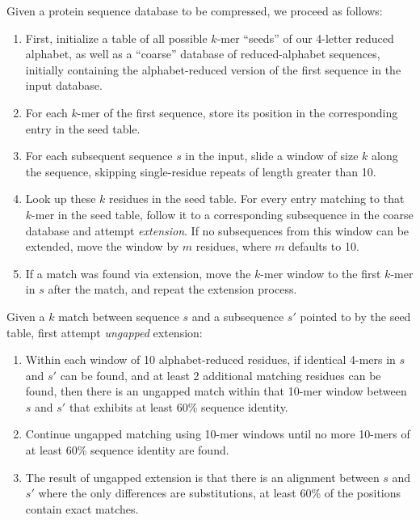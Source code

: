 \documentclass{amsbook}
\theoremstyle{definition}
\theoremstyle{remark}
\numberwithin{equation}{section}
\begin{document}
Given a protein sequence database to be compressed, we proceed as follows:
\begin{enumerate}
        \item First, initialize a table of all possible $k$-mer ``seeds'' of
        our 4-letter reduced alphabet, as well as a ``coarse'' database of
        reduced-alphabet sequences, initially containing the alphabet-reduced
        version of the first sequence in the input database.
        \item For each $k$-mer of the first sequence, store its position in the
        corresponding entry in the seed table.
        \item For each subsequent sequence $s$ in the input, slide a window of 
        size $k$ along the sequence, skipping single-residue repeats of length
        greater than 10.
        \item Look up these $k$ residues in the seed table.
        For every entry matching to that $k$-mer in the seed table, follow
        it to a corresponding subsequence in the coarse database and attempt
        \textit{extension}.
        If no subsequences from this window can be extended, move the window
        by $m$ residues, where $m$ defaults to 10.
        \item If a match was found via extension, move the $k$-mer window to
        the first $k$-mer in $s$ after the match, and repeat the extension
        process.
\end{enumerate}
        
Given a $k$ match between sequence $s$ and a subsequence $s'$ pointed to by the
seed table, first attempt \textit{ungapped} extension:
\begin{enumerate}
        \item Within each window of 10 alphabet-reduced residues, if identical 
        4-mers in $s$ and $s'$ can be found, and at least 2 additional matching 
        residues can be found, then there is an ungapped match within that
        10-mer window between $s$ and $s'$ that exhibits at least 60\% sequence
        identity.
        \item Continue ungapped matching using 10-mer windows until no more
        10-mers of at least 60\% sequence identity are found.
        \item The result of ungapped extension is that there is an alignment 
        between $s$ and $s'$ where the only differences are substitutions,
        at least 60\% of the positions contain exact matches.
\end{enumerate}
        
\end{document}
